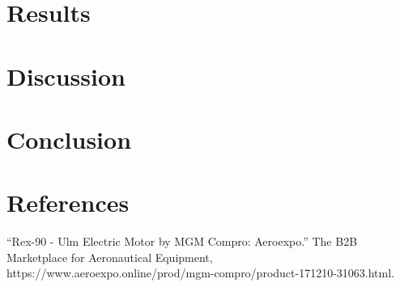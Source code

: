 \documentclass[12pt,A4paper]{article}
\begin{document}
	\section{Results}
	\section{Discussion}
	\section{Conclusion}

	\section{References}
	“Rex-90 - Ulm Electric Motor by MGM Compro: Aeroexpo.” The B2B Marketplace for Aeronautical Equipment, https://www.aeroexpo.online/prod/mgm-compro/product-171210-31063.html. \\ \\

	
	
\end{document}
